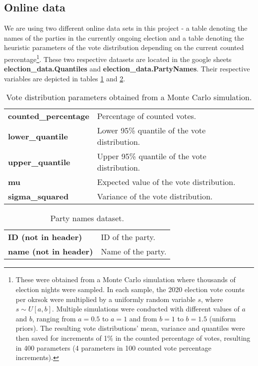 \documentclass[12pt]{article}
\begin{document}
\subsection{Online data}
We are using two different online data sets in this project - a table denoting the names of the parties in the currently ongoing election and a table denoting the heuristic parameters of the vote distribution depending on the current counted percentage\footnote{These were obtained from a Monte Carlo simulation where thousands of election nights were sampled. In each sample, the 2020 election vote counts per okrsok were multiplied by a uniformly random variable $s$, where $s\sim U[a,b]$. Multiple simulations were conducted with different values of $a$ and $b$, ranging from $a=0.5$ to $a=1$ and from $b=1$ to $b=1.5$ (uniform priors). The resulting vote distributions' mean, variance and quantiles were then saved for increments of 1\% in the counted percentage of votes, resulting in 400 parameters (4 parameters in 100 counted vote percentage increments).}. These two respective datasets are located in the google sheets \textbf{election\_data.Quantiles} and \textbf{election\_data.PartyNames}. Their respective variables are depicted in tables \ref{tab:data:election_data:quantiles} and \ref{tab:data:election_data:party_names}.

\begin{table}[h]
	\centering
	\begin{tabularx}{\linewidth}{lX}
		\toprule
		\textbf{counted\_percentage} & Percentage of counted votes. \\
		\textbf{lower\_quantile} & Lower 95\% quantile of the vote distribution. \\
		\textbf{upper\_quantile} & Upper 95\% quantile of the vote distribution. \\
		\textbf{mu} & Expected value of the vote distribution. \\
		\textbf{sigma\_squared} & Variance of the vote distribution. \\		
		\bottomrule
	\end{tabularx}
	\caption{Vote distribution parameters obtained from a Monte Carlo simulation.}
	\label{tab:data:election_data:quantiles}
\end{table}

\begin{table}[h]
	\centering
	\begin{tabularx}{0.65\linewidth}{lX}
		\toprule
		\textbf{ID (not in header)} & ID of the party. \\
		\textbf{name (not in header)} & Name of the party. \\
		\bottomrule
	\end{tabularx}
	\caption{Party names dataset.}
	\label{tab:data:election_data:party_names}
\end{table}
\end{document}
